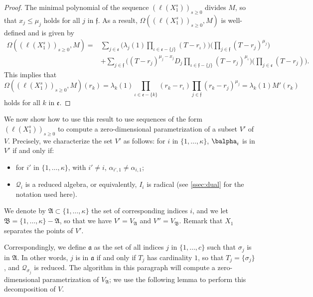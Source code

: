 \documentclass[12pt]{article}
\newcommand{\residueI}{\mathscr{Q}}
\def\dg{\kappa}
\begin{document}
\begin{proof}

        The minimal polynomial of the sequence $(\ell(X_1^s))_{s \ge
          0}$ divides $M$, so that $x_j \le \mu_j$ holds for all $j$
        in $\mathfrak{f}$.  As a result,
        $\Omega((\ell(X_1^s))_{s\ge0},M)$ is well-defined and is given by
	\begin{align*}
	\Omega((\ell(X_1^s))_{s\ge0},M)=&
	\sum_{j \in \mathfrak{e}}
	\Big(
	\lambda_j(1) \prod_{\iota \in \mathfrak{e}-\{j\}}(T-r_\iota)\Big)
	\Big(\prod_{j \in \mathfrak{f}}(T-r_j)^{\mu_j} \Big)\\
	&+
	\sum_{j\in \mathfrak{f}}
	\Big(  (T-r_j)^{\mu_j-x_j} D_j
	\prod_{\iota \in \mathfrak{f}-\{j\}}(T-r_j)^{\mu_\iota}\Big)
	\Big(\prod_{j\in \mathfrak{e}} (T-r_j) \Big).
	\end{align*}
	This implies that $$\Omega((\ell(X_1^s))_{s\ge0},M)(r_k) =\lambda_k(1) 
	\prod_{\iota \in \mathfrak{e}-\{k\}}(r_k-r_\iota)
	\prod_{j \in \mathfrak{f}}(r_k-r_j)^{\mu_j} = \lambda_k(1) M'(r_k)$$ 
	holds for all $k$ in $\mathfrak{e}$.
\end{proof}

We now show how to use this result to use sequences of the form
$(\ell(X_1^s))_{s \ge 0}$ to compute a zero-dimensional
parametrization of a subset $V'$ of $V$. Precisely, we characterize
the set $V'$ as follows: for $i$ in $\{1,\dots,\dg\}$, $\balpha_i$ is in
$V'$ if and only if:
\begin{itemize}
	\item for $i'$ in $\{1,\dots,\dg\}$, with $i'\ne i$, $\alpha_{i',1} \ne
	\alpha_{i,1}$;
	\item $\residueI_i$ is a reduced algebra, or equivalently, $I_i$ is radical (see \cref{ssec:dual} 
          for the notation used here).
\end{itemize}
We denote by $\mathfrak{A}\subset \{1,\dots,\dg\}$ the set of
corresponding indices $i$, and we let
$\mathfrak{B}=\{1,\dots,\dg\}-\mathfrak{A}$, so that we have
$V'=V_{\mathfrak{A}}$ and $V''=V_{\mathfrak{B}}$.  Remark that $X_1$
separates the points of $V'$.

Correspondingly, we define $\mathfrak{a}$ as the set of all indices
$j$ in $\{1,\dots,c\}$ such that $\sigma_j$ is in $\mathfrak{A}$. In
other words, $j$ is in $\mathfrak{a}$ if and only if $T_j$ has
cardinality $1$, so that $T_j=\{\sigma_j\}$, and $\residueI_{\sigma_j}$ is reduced.  The algorithm in this
paragraph will compute a zero-dimensional parametrization of
$V_{\mathfrak{A}}$; we use the following lemma to perform this
decomposition of $V$.
\end{document}
